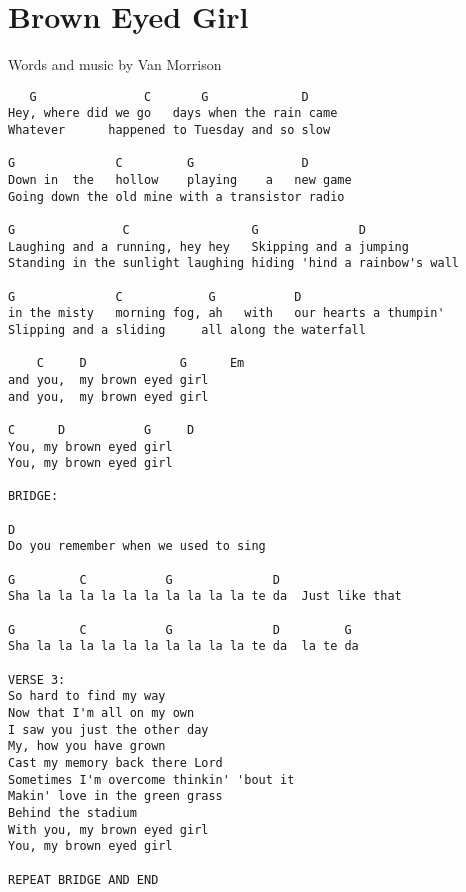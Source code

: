 \section{Brown Eyed Girl} \label{sec:song3}
Words and music by Van Morrison
\begin{verbatim}
   G               C       G             D  
Hey, where did we go   days when the rain came
Whatever      happened to Tuesday and so slow

G              C         G               D     
Down in  the   hollow    playing    a   new game 
Going down the old mine with a transistor radio

G               C                 G              D         
Laughing and a running, hey hey   Skipping and a jumping
Standing in the sunlight laughing hiding 'hind a rainbow's wall

G              C            G           D
in the misty   morning fog, ah   with   our hearts a thumpin'
Slipping and a sliding     all along the waterfall

    C     D             G      Em
and you,  my brown eyed girl 
and you,  my brown eyed girl 

C      D           G     D
You, my brown eyed girl
You, my brown eyed girl
  
BRIDGE:
 
D
Do you remember when we used to sing
 
G         C           G              D
Sha la la la la la la la la la la te da  Just like that
 
G         C           G              D         G
Sha la la la la la la la la la la te da  la te da
 
VERSE 3:
So hard to find my way 
Now that I'm all on my own
I saw you just the other day
My, how you have grown
Cast my memory back there Lord
Sometimes I'm overcome thinkin' 'bout it
Makin' love in the green grass
Behind the stadium
With you, my brown eyed girl
You, my brown eyed girl
 
REPEAT BRIDGE AND END
\end{verbatim}
